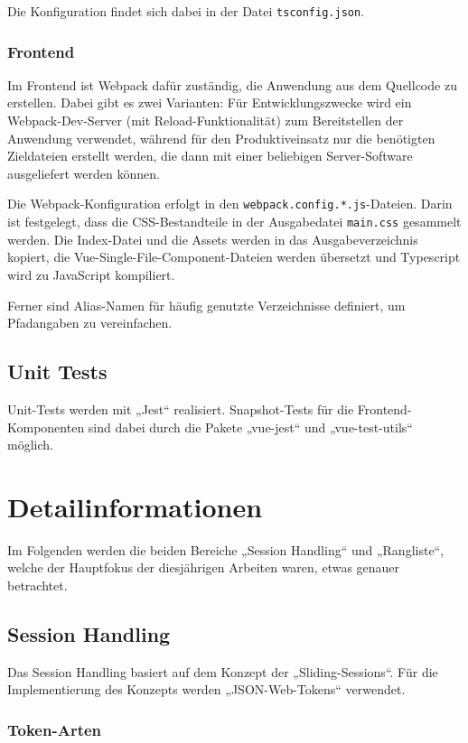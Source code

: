 \documentclass[letterpaper, 10 pt, conference]{ieeeconf}
\begin{document}
Die Konfiguration findet sich dabei in der Datei \texttt{tsconfig.json}.

\subsubsection{Frontend}

Im Frontend ist Webpack dafür zuständig, die Anwendung aus dem Quellcode zu erstellen.
Dabei gibt es zwei Varianten:
Für Entwicklungszwecke wird ein Webpack-Dev-Server (mit Reload-Funktionalität) zum Bereitstellen der Anwendung verwendet,
während für den Produktiveinsatz nur die benötigten Zieldateien erstellt werden, die dann mit einer beliebigen Server-Software ausgeliefert werden können.

Die Webpack-Konfiguration erfolgt in den \texttt{webpack.config.*.js}-Dateien.
Darin ist festgelegt, dass die CSS-Bestandteile in der Ausgabedatei \texttt{main.css} gesammelt werden.
Die Index-Datei und die Assets werden in das Ausgabeverzeichnis kopiert, die Vue-Single-File-Component-Dateien werden übersetzt
und Typescript wird zu JavaScript kompiliert.

Ferner sind Alias-Namen für häufig genutzte Verzeichnisse definiert, um Pfadangaben zu vereinfachen.

\subsection{Unit Tests}

Unit-Tests werden mit „Jest“ realisiert.
Snapshot-Tests für die Frontend-Komponenten sind dabei durch die Pakete „vue-jest“ und „vue-test-utils“ möglich.

\section{Detailinformationen}

Im Folgenden werden die beiden Bereiche „Session Handling“ und „Rangliste“, welche der Hauptfokus der diesjährigen Arbeiten waren, etwas genauer betrachtet.

\subsection{Session Handling}

Das Session Handling basiert auf dem Konzept der „Sliding-Sessions“.  Für die Implementierung des Konzepts werden „JSON-Web-Tokens“\cite{c2} verwendet. 

\subsubsection{Token-Arten}
\end{document}
